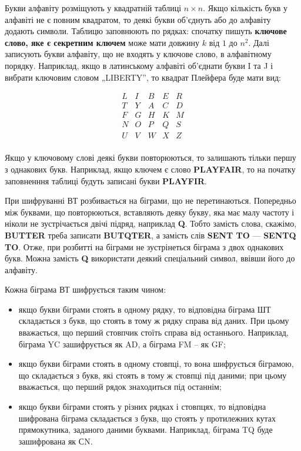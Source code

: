 Букви алфавіту розміщують у квадратній таблиці $n \times n$. Якщо кількість
букв у алфавіті не є повним квадратом, то деякі букви об’єднуть або до
алфавіту додають символи. Таблицю заповнюють по рядках: спочатку
пишуть \textbf{ключове слово, яке є секретним ключем} може мати довжину $k$ від $1$
до $n^2$. Далі записують букви алфавіту, що не входять у ключове слово, в
алфавітному порядку. Наприклад, якщо в латинському алфавіті об’єднати
букви I та J і вибрати ключовим словом „LIBERTY”, то квадрат Плейфера
буде мати вид:

$$\begin{matrix}
    L & I & B & E & R  \\
    T & Y & A & C & D  \\
    F & G & H & K & M  \\
    N & O & P & Q & S  \\
    U & V & W & X & Z  \\
\end{matrix}$$

Якщо у ключовому слові деякі букви повторюються, то залишають
тільки першу з однакових букв. Наприклад, якщо ключем є слово
\textbf{PLAYFAIR}, то на початку заповненння таблиці будуть
записані букви \textbf{PLAYFIR}.

При шифруванні ВТ розбивається на біграми, що не перетинаються.
Попередньо між буквами, що повторюються, вставляють деяку букву, яка
має малу частоту і ніколи не зустрічається двічі підряд, наприклад
\textbf{Q}. Тобто замість слова, скажімо, \textbf{BUTTER} треба записати
\textbf{BUTQTER}, а замість слів \textbf{SENT TO} --- \textbf{SENTQ TO}.
Отже, при розбитті на біграми не зустрінеться біграма з двох однакових
букв. Можна замість \textbf{Q} використати деякий спеціальний символ,
ввівши його до алфавіту.

Кожна біграма ВТ шифрується таким чином:
\begin{itemize}
    \item якщо букви біграми стоять в одному рядку, то відповідна біграма ШТ
    складається з букв, що стоять в тому ж рядку справа від даних. При
    цьому вважається, що перший стовпчик стоїть справа від останнього.
    Наприклад, біграма YC зашифрується як AD, а біграма FM – як GF;
    \item якщо букви біграми стоять в одному стовпці, то вона шифрується
    біграмою, що складається з букв, які стоять в тому ж стовпці під
    даними; при цьому вважається, що перший рядок знаходиться під
    останнім;
    \item якщо букви біграми стоять у різних рядках і стовпцях, то відповідна
    шифрована біграма складається з букв, що стоять у протилежних кутах
    прямокутника, заданого даними буквами. Наприклад, біграма TQ буде
    зашифрована як СN.
\end{itemize}

